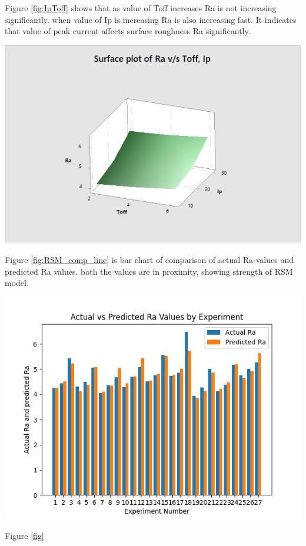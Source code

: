 \documentclass[suppldata]{interact}
\begin{document}
   Figure \ref{fig:IpToff} shows that as value of Toff increases Ra is not  increasing significantly. when value of Ip is increasing  Ra is also increasing fast. It indicates that value of peak current affects surface roughness Ra significantly.
  \begin{minipage}{1\textwidth}
    \centering
    \includegraphics[width=\linewidth]{Ra-Toff,Ip.jpg}
    \label{fig:IpToff}
  \end{minipage}
  \hfill
 
 
   Figure \ref{fig:RSM_comp_line} is bar chart of comparison of actual Ra-values and predicted Ra values. both the values are in proximity, showing strength of RSM model. 
  \begin{minipage}{1\textwidth}
     \centering
    \includegraphics[width=\textwidth]{comp_Ra_pRa.jpg}
    \label{fig:RSM_comp_line}
  \end{minipage}
  \newpage
    Figure \ref{fig}  
\end{document}
